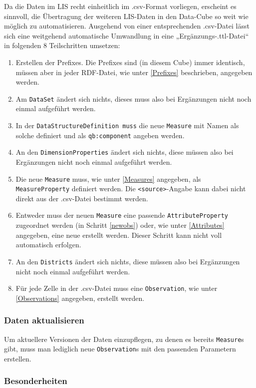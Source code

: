 \documentclass[a4paper,11pt]{article}
\begin{document}
Da die Daten im LIS recht einheitlich im .csv-Format vorliegen, erscheint es
sinnvoll, die Übertragung der weiteren LIS-Daten in den Data-Cube so weit wie
möglich zu automatisieren. Ausgehend von einer entsprechenden .csv-Datei lässt
sich eine weitgehend automatische Umwandlung in eine
„Ergänzungs-.ttl-Datei“ in folgenden 8 Teilschritten umsetzen: 
\begin{enumerate}
\item Erstellen der Prefixes. Die Prefixes sind (in diesem Cube) immer
  identisch, müssen aber in jeder RDF-Datei, wie unter \ref{Prefixes}
  beschrieben, angegeben werden. 
\item Am \texttt{DataSet} ändert sich nichts, dieses muss also bei Ergänzungen
  nicht noch einmal aufgeführt werden.
\item In der \texttt{DataStructureDefinition muss} die neue \texttt{Measure}
  mit Namen als solche definiert und als \texttt{qb:component} angeben
  werden.  \label{newmeasure}
\item An den \texttt{DimensionProperties} ändert sich nichts, diese müssen
  also bei Ergänzungen nicht noch einmal aufgeführt werden.
\item Die neue \texttt{Measure} muss, wie unter \ref{Measures} angegeben, als
  \texttt{MeasureProperty} definiert werden. Die \texttt{<source>}-Angabe kann
  dabei nicht direkt aus der .csv-Datei bestimmt werden.
\item Entweder muss der neuen \texttt{Measure} eine passende
  \texttt{AttributeProperty} zugeordnet werden (in Schritt \ref{newobs}) oder,
  wie unter \ref{Attributes} angegeben, eine neue erstellt werden. Dieser
  Schritt kann nicht voll automatisch erfolgen.
\item An den \texttt{Districts} ändert sich nichts, diese müssen also bei
  Ergänzungen nicht noch einmal aufgeführt werden.
\item Für jede Zelle in der .csv-Datei muss eine \texttt{Observation}, wie
  unter \ref{Observations} angegeben, erstellt werden.\label{newobs}
\end{enumerate}

\subsubsection {Daten aktualisieren}
Um aktuellere Versionen der Daten einzupflegen, zu denen es bereits
\texttt{Measure}s gibt, muss man lediglich neue \texttt{Observation}s mit den
passenden Parametern erstellen.

\subsubsection{Besonderheiten}
\end{document}
